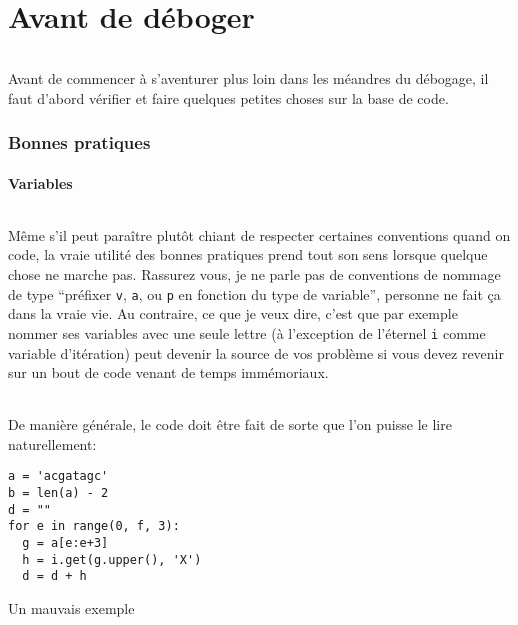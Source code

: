 \part{Avant de déboger}%
\label{part:before}

\paragraph{} Avant de commencer à s'aventurer plus loin dans les méandres du
débogage, il faut d'abord vérifier et faire quelques petites choses sur la base
de code.

\section{Bonnes pratiques}

\subsection{Variables}

\paragraph{} Même s'il peut paraître plutôt chiant de respecter certaines
conventions quand on code, la vraie utilité des bonnes pratiques prend tout son
sens lorsque quelque chose ne marche pas. Rassurez vous, je ne parle pas de
conventions de nommage de type ``préfixer \texttt{v}, \texttt{a}, ou \texttt{p}
en fonction du type de variable'', personne ne fait ça dans la vraie vie. Au
contraire, ce que je veux dire, c'est que par exemple nommer ses variables avec
une seule lettre (à l'exception de l'éternel \texttt{i} comme variable
d'itération) peut devenir la source de vos problème si vous devez revenir sur
un bout de code venant de temps immémoriaux.

\paragraph{} De manière générale, le code doit être fait de sorte que l'on
puisse le lire naturellement:

\begin{listing}[H]
	\centering
	\begin{verbatim}
a = 'acgatagc'
b = len(a) - 2
d = ""
for e in range(0, f, 3):
  g = a[e:e+3]
  h = i.get(g.upper(), 'X')
  d = d + h
	\end{verbatim}
	\caption{Un mauvais exemple}
\end{listing}

